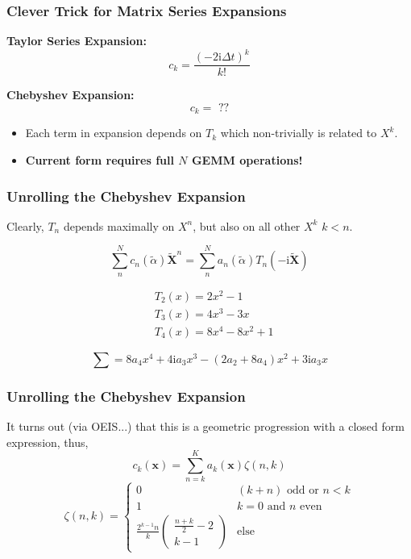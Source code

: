 \documentclass{beamer}
\begin{document}
\begin{frame}
\frametitle{Clever Trick for Matrix Series Expansions}

\textbf{Taylor Series Expansion:}
\begin{equation*}
c_k = \frac{(-2\mathrm{i}\Delta t)^k}{k!}
\end{equation*}

\textbf{Chebyshev Expansion:}
\begin{equation*}
c_k = \text{ ??}
\end{equation*}
\begin{itemize}
  \item Each term in expansion depends on $T_k$ which non-trivially is related to $X^k$.
  \item \bf Current form requires full $N$ GEMM operations!
\end{itemize}
\end{frame}

\begin{frame}
\frametitle{Unrolling the Chebyshev Expansion}

Clearly, $T_n$ depends maximally on $X^n$, but also on all other $X^k$ $k < n$.

\begin{equation*}
\sum_n^N c_n(\tilde{\alpha}) \mathbf{\tilde{X}}^n = \sum_n^N  a_n(\tilde{\alpha})T_n(-\mathrm{i}\tilde{\mathbf{X}})
\end{equation*}

\begin{align*}
&T_2(x) = 2x^2 - 1\\
&T_3(x) = 4x^3 - 3x\\
&T_4(x) = 8x^4 - 8x^2 + 1
\end{align*}

\begin{equation*}
\sum = 8a_4x^4 + 4\mathrm{i}a_3x^3 - (2a_2 + 8a_4)x^2 + 3\mathrm{i}a_3x
\end{equation*}

\end{frame}


\begin{frame}
\frametitle{Unrolling the Chebyshev Expansion}

It turns out (via OEIS...) that this is a geometric progression with a closed form expression,
thus,
\begin{equation*}
c_k(\mathbf{x}) = \sum_{n = k}^K a_k(\mathbf{x}) \zeta(n,k)
\end{equation*}
\begin{equation*}
\zeta(n,k) = \begin{cases}
0 & (k+n)\text{ odd or } n < k \\
1 & k = 0 \text{ and } n \text{ even}\\
\frac{2^{k-1}n}{k} \begin{pmatrix} \frac{n+k}{2} - 2 \\ k - 1\end{pmatrix} & \text{else}
\end{cases}
\end{equation*}

\end{frame}
\end{document}
